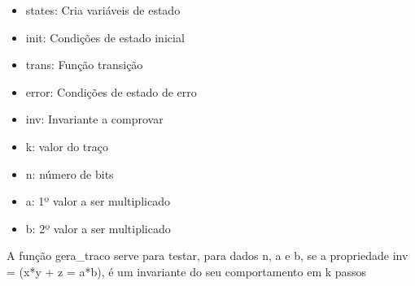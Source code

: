 \documentclass[11pt]{article}
\providecommand{\tightlist}{%
      \setlength{\itemsep}{0pt}\setlength{\parskip}{0pt}}
\begin{document}
\begin{itemize}
\tightlist
\item
  states: Cria variáveis de estado
\item
  init: Condições de estado inicial
\item
  trans: Função transição
\item
  error: Condições de estado de erro
\item
  inv: Invariante a comprovar
\item
  k: valor do traço
\item
  n: número de bits
\item
  a: 1º valor a ser multiplicado
\item
  b: 2º valor a ser multiplicado
\end{itemize}

A função gera\_traco serve para testar, para dados n, a e b, se a
propriedade inv = (x*y + z = a*b), é um invariante do seu comportamento
em k passos
\end{document}
